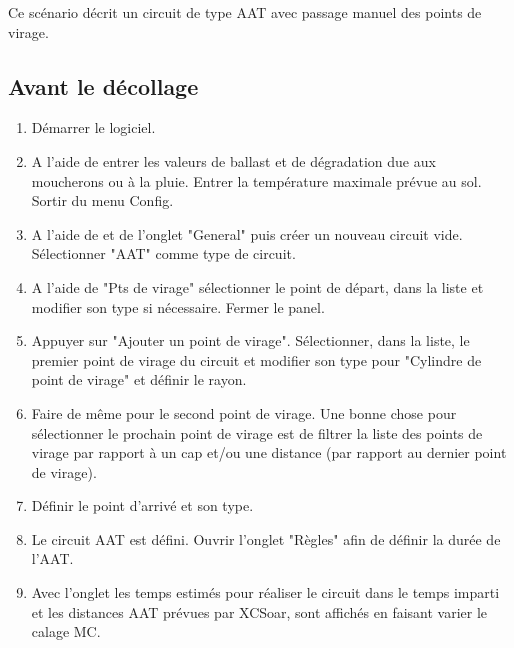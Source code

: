 Ce scénario décrit un circuit de type AAT avec passage manuel des points de virage.

\subsection*{Avant le décollage}
\begin{enumerate}
\item  Démarrer le logiciel.
\item  A l'aide de \blink{}entrer les valeurs de ballast et de dégradation due aux moucherons ou à la pluie. Entrer la température maximale prévue au sol. Sortir du menu Config.
\item  A l'aide de \blink{}et de l'onglet "General" puis créer un nouveau circuit vide. Sélectionner "AAT"  comme type de circuit.
\item A l'aide de "Pts de virage" sélectionner le point de départ, dans la liste et modifier son type si nécessaire. Fermer le panel.
\item Appuyer sur "Ajouter un point de virage". Sélectionner, dans la liste, le premier point de virage du circuit et modifier son type pour "Cylindre de point de virage" et définir le rayon.
\item Faire de même pour le second point de virage. Une bonne chose pour sélectionner le prochain point de virage est de filtrer la liste des points de virage par rapport à un cap et/ou une distance (par rapport au dernier point de virage). 
\item  Définir le point d'arrivé et son type. 
\item Le circuit AAT est défini. Ouvrir l'onglet "Règles" afin de définir la durée de l'AAT.
\item Avec l'onglet  les temps estimés pour réaliser le circuit dans le temps imparti et les distances AAT prévues par XCSoar, sont affichés en faisant varier le calage MC. 
\end{enumerate}

